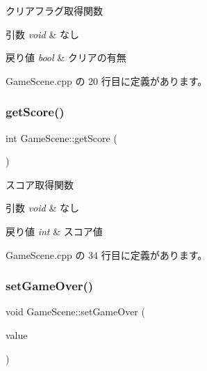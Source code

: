 クリアフラグ取得関数 


\begin{DoxyParams}{引数}
{\em void} & なし \\
\hline
\end{DoxyParams}

\begin{DoxyRetVals}{戻り値}
{\em bool} & クリアの有無 \\
\hline
\end{DoxyRetVals}


 Game\+Scene.\+cpp の 20 行目に定義があります。

\mbox{\label{class_game_scene_a16b26b3b8ea91dcaf762292414bf5d6d}} 
\subsubsection{\texorpdfstring{get\+Score()}{getScore()}}
{\footnotesize\ttfamily int Game\+Scene\+::get\+Score (\begin{DoxyParamCaption}{ }\end{DoxyParamCaption})}



スコア取得関数 


\begin{DoxyParams}{引数}
{\em void} & なし \\
\hline
\end{DoxyParams}

\begin{DoxyRetVals}{戻り値}
{\em int} & スコア値 \\
\hline
\end{DoxyRetVals}


 Game\+Scene.\+cpp の 34 行目に定義があります。

\mbox{\label{class_game_scene_abaefc8ae1bd5625d79da25120ef33a8e}} 
\subsubsection{\texorpdfstring{set\+Game\+Over()}{setGameOver()}}
{\footnotesize\ttfamily void Game\+Scene\+::set\+Game\+Over (\begin{DoxyParamCaption}\item[{int}]{value }\end{DoxyParamCaption})}



